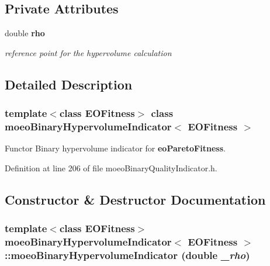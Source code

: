 \subsection*{Private Attributes}
\begin{CompactItemize}
\item 
double {\bf rho}\label{classmoeoBinaryHypervolumeIndicator_06b7c3ba8fa0ceafd7e6b571e43e6f4c}

\begin{CompactList}\small\item\em reference point for the hypervolume calculation \item\end{CompactList}\end{CompactItemize}


\subsection{Detailed Description}
\subsubsection*{template$<$class EOFitness$>$ class moeo\-Binary\-Hypervolume\-Indicator$<$ EOFitness $>$}

Functor Binary hypervolume indicator for {\bf eo\-Pareto\-Fitness}. 



Definition at line 206 of file moeo\-Binary\-Quality\-Indicator.h.

\subsection{Constructor \& Destructor Documentation}
\subsubsection{\setlength{\rightskip}{0pt plus 5cm}template$<$class EOFitness$>$ {\bf moeo\-Binary\-Hypervolume\-Indicator}$<$ EOFitness $>$::{\bf moeo\-Binary\-Hypervolume\-Indicator} (double {\em \_\-rho})\hspace{0.3cm}{\tt  [inline]}}\label{classmoeoBinaryHypervolumeIndicator_15d486d524816d294bc007d7a555cbfe}



